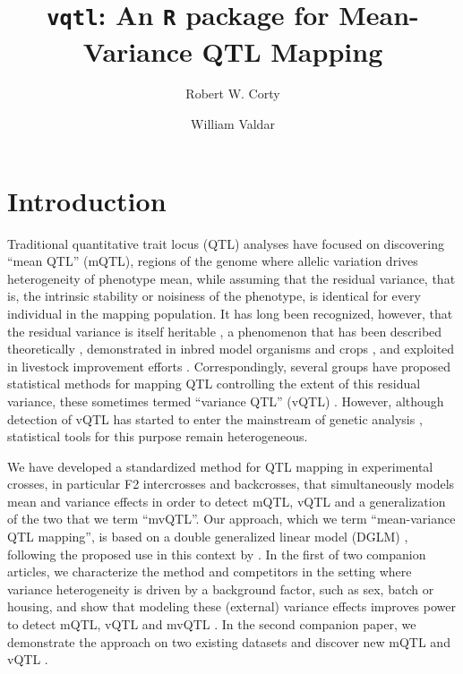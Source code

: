\documentclass[9pt,twocolumn,twoside]{gsag3jnl}
\title{\texttt{vqtl}: An \texttt{R} package for Mean-Variance QTL Mapping}
\author[$\ast,\dagger$]{Robert W. Corty}
\author[$\ast,\ddagger,1$]{William Valdar}
\affil[$\ast$]{Department of Genetics}
\affil[$\dagger$]{Bioinformatics and Computational Biology Curriculum}
\affil[$\ddagger$]{and Lineberger Comprehensive Cancer Center, University of North Carolina,
    Chapel Hill, NC}
\begin{document}
\maketitle
\thispagestyle{firststyle}
\articletypemark
\marginmark
\firstpagefootnote
{}
\vspace{-24pt}



\section*{Introduction}

Traditional quantitative trait locus (QTL) analyses have focused on discovering ``mean QTL'' (mQTL), regions of the genome where allelic variation drives heterogeneity of phenotype mean, while assuming that the residual variance, that is, the intrinsic stability or noisiness of the phenotype, is identical for every individual in the mapping population.
It has long been recognized, however, that the residual variance is itself heritable \citep{Falconer1965,Lynch1998a}, a
phenomenon that has been described theoretically \citep{Hill2004,Hill2010}, demonstrated in inbred model organisms \citep{Sorensen2015} and crops \citep{Yang2012}, and exploited in livestock improvement efforts \citep{Mulder2008,Ibanez-Escriche2008a}.
Correspondingly, several groups have proposed statistical methods for mapping QTL controlling the extent of this residual variance, these sometimes termed ``variance QTL'' (vQTL) \citep{Pare2010,Ronnegard2011a,Ronnegard2012a,Cao2014,Soave2017,Dumitrascu2018}.
However, although detection of vQTL has started to enter the mainstream of genetic analysis \citep{Yang2012,Hulse2013,Ayroles2015,Forsberg2015,Wei2016,Wang2017,Wei2017}, statistical tools for this purpose remain heterogeneous. 

We have developed a standardized method for QTL mapping in experimental crosses, in particular F2 intercrosses and backcrosses, that simultaneously models mean and variance effects in order to detect mQTL, vQTL and a generalization of the two that we term ``mvQTL''.
Our approach, which we term ``mean-variance QTL mapping'', is based on a double generalized linear model (DGLM) \citep{Smyth1989}, following the proposed use in this context by \citet{Ronnegard2011a}.
In the first of two companion articles, we characterize the method and competitors in the setting where variance heterogeneity is driven by a background factor, such as sex, batch or housing, and show that modeling these (external) variance effects improves power to detect mQTL, vQTL and mvQTL \citep{CortyValdar2018bvh-biorxiv}.
In the second companion paper, we demonstrate the approach on two existing datasets and discover new mQTL and vQTL \citep{Corty2018biorxiv}. 
\end{document}
